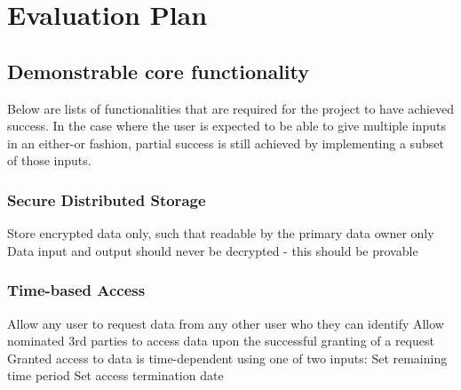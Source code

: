 \section{Evaluation Plan}




\subsection{Demonstrable core functionality}

Below are lists of functionalities that are required for the project to have achieved success. In the case where the user is expected to be able to give multiple inputs in an either-or fashion, partial success is still achieved by implementing a subset of those inputs.

\subsubsection{Secure Distributed Storage}

\begin{outline}
  \1 Store encrypted data only, such that readable by the primary data owner only
  \1 Data input and output should never be decrypted - this should be provable
\end{outline}

\subsubsection{Time-based Access}

\begin{outline}
  \1 Allow any user to request data from any other user who they can identify
  \1 Allow nominated 3rd parties to access data upon the successful granting of a request
  \1 Granted access to data is time-dependent using one of two inputs:
    \2 Set remaining time period
    \2 Set access termination date
\end{outline}

